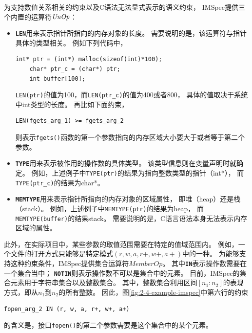 为支持数值关系相关的约束以及C语法无法显式表示的语义约束，
IMSpec提供三个内置的运算符$\mathit{UnOp}$：
\begin{itemize}
	\item 
	\textbf{\texttt{LEN}}用来表示指针所指向的内存对象的长度。
	需要说明的是，该运算符与指针具体的类型相关。
	例如下列代码中，
	\begin{lstlisting}[language={[ANSI]C},
	basicstyle=\linespread{0.8}\listingsfont,
	numbers=none,
	xleftmargin=.15\textwidth]
	int* ptr = (int*) malloc(sizeof(int)*100);
	char* ptr_c = (char*) ptr;
	int buffer[100];
	\end{lstlisting}
	\texttt{LEN(ptr)}的值为100，而\texttt{LEN(ptr\_c)}的值为400或者800，
	具体的值取决于系统中int类型的长度。
	再比如下面约束，
	\begin{lstlisting}[language={[ANSI]C},
	basicstyle=\linespread{0.8}\listingsfont,
	numbers=none,
	xleftmargin=.15\textwidth]
	LEN(fgets_arg_1) >= fgets_arg_2
	\end{lstlisting}
	则表示\texttt{fgets()}函数的第一个参数指向的内存区域大小要大于或者等于第二个参数。
	\item 
	\textbf{\texttt{TYPE}}用来表示被作用的操作数的具体类型。
	该类型信息则在变量声明时就确定。
	例如，上述例子中\texttt{TYPE(ptr)}的结果为指向整数类型的指针（int*），
	而\texttt{TYPE(ptr\_c)}的结果为char*。
	\item 
	 \textbf{\texttt{MEMTYPE}}用来表示指针所指向的内存对象的区域属性，
	即堆（heap）还是栈（stack）。
	例如，上述例子中\texttt{MEMTYPE(ptr)}的结果为heap，
	而\texttt{MEMTYPE(buffer)}的结果stack。
	需要说明的是，C语言语法本身无法表示内存区域的属性。
\end{itemize}

此外，在实际项目中，某些参数的取值范围需要在特定的值域范围内。
例如，一个文件的打开方式只能够是特定模式$(r, w, a, r+, w+, a+)$中的一种。
为能够支持这种约束条件，IMSpec提供集合运算符$\mathit{MemberOp}$。
其中\texttt{\textbf{IN}}表示操作数需要在一个集合当中；
\texttt{\textbf{NOTIN}}则表示操作数不可以是集合中的元素。
目前，IMSpec的集合元素用于字符串集合以及整数集合。
其中，整数集合利用区间$[n_1:n_2]$的表现方式，即从$n_1$到$n_2$的所有整数。
因此，图\ref{fig:2-4-example-imspec}中第六行的约束
\begin{lstlisting}[language={[ANSI]C},
basicstyle=\linespread{0.8}\listingsfont,
numbers=none,
xleftmargin=.3\textwidth]
fopen_arg_2 IN (r, w, a, r+, w+, a+)
\end{lstlisting}
的含义是，接口\texttt{fopen()}的第二个参数需要是这个集合中的某个元素。


